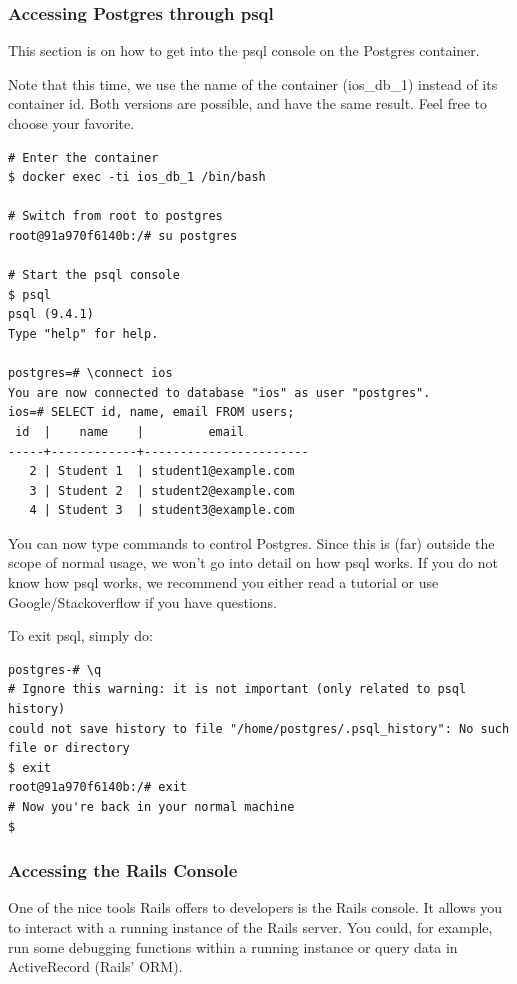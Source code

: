 \subsubsection{Accessing Postgres through psql}
This section is on how to get into the psql console on the Postgres container.

Note that this time, we use the name of the container (ios\_db\_1) instead of its container id. Both versions are possible, and have the same result. Feel free to choose your favorite.

\begin{verbatim}
# Enter the container
$ docker exec -ti ios_db_1 /bin/bash

# Switch from root to postgres
root@91a970f6140b:/# su postgres

# Start the psql console
$ psql
psql (9.4.1)
Type "help" for help.

postgres=# \connect ios
You are now connected to database "ios" as user "postgres".
ios=# SELECT id, name, email FROM users;             
 id  |    name    |         email                
-----+------------+-----------------------
   2 | Student 1  | student1@example.com
   3 | Student 2  | student2@example.com
   4 | Student 3  | student3@example.com
\end{verbatim}

You can now type commands to control Postgres. Since this is (far) outside the scope of normal usage, we won't go into detail on how psql works. If you do not know how psql works, we recommend you either read a tutorial or use Google/Stackoverflow if you have questions.

To exit psql, simply do:
\begin{verbatim}
postgres-# \q
# Ignore this warning: it is not important (only related to psql history)
could not save history to file "/home/postgres/.psql_history": No such file or directory
$ exit
root@91a970f6140b:/# exit
# Now you're back in your normal machine
$ 
\end{verbatim}

\subsubsection{Accessing the Rails Console}
One of the nice tools Rails offers to developers is the Rails console. It allows you to interact with a running instance of the Rails server. You could, for example, run some debugging functions within a running instance or query data in ActiveRecord (Rails' ORM).

